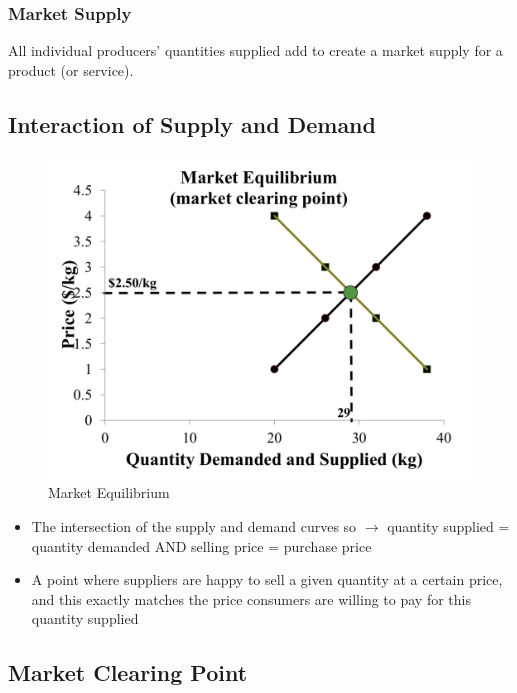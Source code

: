 \subsubsection{Market Supply}
All individual producers' quantities supplied add to create a market supply for a product (or service).

\subsection{Interaction of Supply and Demand}
\begin{figure}[H]
	\centering
	\includegraphics[width=0.9\linewidth]{cross}
	\caption{Market Equilibrium}
\end{figure}
\begin{itemize}
	\item The intersection of the supply and demand curves so $\rightarrow$ quantity supplied = quantity demanded AND selling price = purchase price
	\item A point where suppliers are happy to sell a given quantity at a certain price, and this exactly matches the price consumers are willing to  pay for this quantity supplied
\end{itemize}

\subsection{Market Clearing Point}
